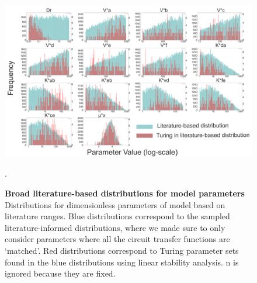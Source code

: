 \begin{figure}[H] %
    \centering
    \begin{adjustbox}{center}
        \includegraphics[width=1.2\textwidth]{chapters/Chapter 2/param_distributions} %
    \end{adjustbox}
    \caption{ \textbf{Broad literature-based distributions for model parameters} Distributions for dimensionless parameters of model based on literature ranges. Blue distributions correspond to the sampled literature-informed distributions, where we made sure to only consider parameters where all the circuit transfer functions are ‘matched’. Red distributions correspond to Turing parameter sets found in the blue distributions using linear stability analysis. n is ignored because they are fixed. }. %
    \label{fig:param_distributions_turing_vs_noturing} %
\end{figure}

